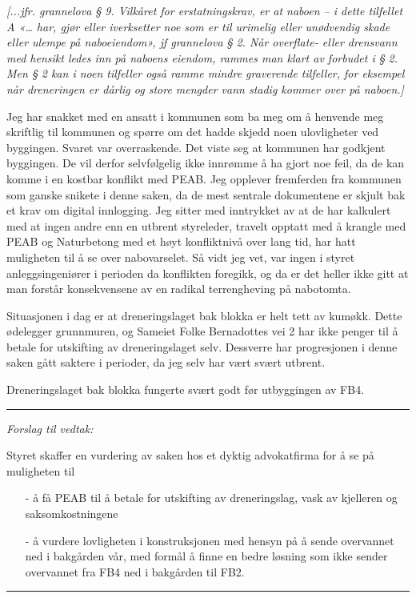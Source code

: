 \documentclass[12pt]{article}
\begin{document}
{\em{}[...jfr. grannelova § 9. Vilkåret for erstatningskrav, er at naboen – i dette tilfellet A «… har, gjør
eller iverksetter noe som er til urimelig eller unødvendig skade eller ulempe på naboeiendom», jf
grannelova § 2. Når overflate- eller drensvann med hensikt ledes inn på naboens eiendom, rammes
man klart av forbudet i § 2. Men § 2 kan i noen tilfeller også ramme mindre graverende tilfeller, for
eksempel når dreneringen er dårlig og store mengder vann stadig kommer over på naboen.]}

Jeg har snakket med en ansatt i kommunen som ba meg om å henvende meg skriftlig til kommunen
og spørre om det hadde skjedd noen ulovligheter ved byggingen. Svaret var overraskende. Det viste
seg at kommunen har godkjent byggingen. De vil derfor selvfølgelig ikke innrømme å ha gjort noe
feil, da de kan komme i en kostbar konflikt med PEAB. Jeg opplever fremferden fra kommunen
som ganske snikete i denne saken, da de mest sentrale dokumentene er skjult bak et krav om digital
innlogging. Jeg sitter med inntrykket av at de har kalkulert med at ingen andre enn en utbrent
styreleder, travelt opptatt med å krangle med PEAB og Naturbetong med et høyt konfliktnivå over
lang tid, har hatt muligheten til å se over nabovarselet. Så vidt jeg vet, var ingen i styret
anleggsingeniører i perioden da konflikten foregikk, og da er det heller ikke gitt at man forstår
konsekvensene av en radikal terrengheving på nabotomta.

Situasjonen i dag er at dreneringslaget bak blokka er helt tett av kumøkk. Dette ødelegger
grunnmuren, og Sameiet Folke Bernadottes vei 2 har ikke penger til å betale for utskifting av
dreneringslaget selv. Dessverre har progresjonen i denne saken gått saktere i perioder, da jeg selv
har vært svært utbrent.

Dreneringslaget bak blokka fungerte svært godt før utbyggingen av FB4.

{\rule{\textwidth}{0.3pt}}

{\em Forslag til vedtak:}

Styret skaffer en vurdering av saken hos et dyktig advokatfirma for å se på muligheten til
\begin{itemize}
\item[-] å få PEAB til å betale for utskifting av dreneringslag, vask av kjelleren og
saksomkostningene
\item[-] å vurdere lovligheten i konstruksjonen med hensyn på å sende overvannet ned i bakgården
vår, med formål å finne en bedre løsning som ikke sender overvannet fra FB4 ned i bakgården
til FB2.
\end{itemize}
{\rule{\textwidth}{0.3pt}}
\end{document}
